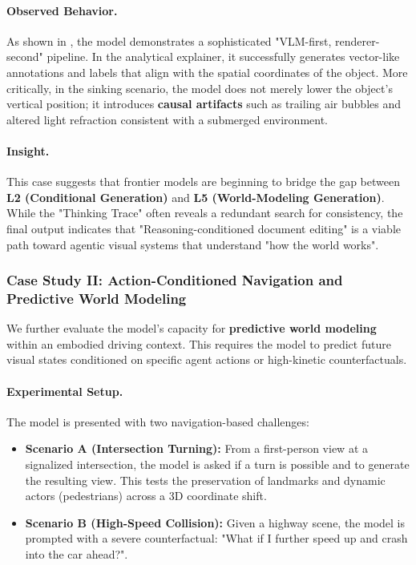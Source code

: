 \paragraph{Observed Behavior.}
As shown in , the model demonstrates a sophisticated "VLM-first, renderer-second" pipeline. In the analytical explainer, it successfully generates vector-like annotations and labels that align with the spatial coordinates of the object. More critically, in the sinking scenario, the model does not merely lower the object's vertical position; it introduces \textbf{causal artifacts} such as trailing air bubbles and altered light refraction consistent with a submerged environment.

\paragraph{Insight.}
This case suggests that frontier models are beginning to bridge the gap between \textbf{L2 (Conditional Generation)} and \textbf{L5 (World-Modeling Generation)}. While the "Thinking Trace" often reveals a redundant search for consistency, the final output indicates that "Reasoning-conditioned document editing" is a viable path toward agentic visual systems that understand "how the world works".


\subsubsection{Case Study II: Action-Conditioned Navigation and Predictive World Modeling}
\label{subsubsec:driving_collision_case}

We further evaluate the model's capacity for \textbf{predictive world modeling} within an embodied driving context. This requires the model to predict future visual states conditioned on specific agent actions or high-kinetic counterfactuals.

\paragraph{Experimental Setup.}
The model is presented with two navigation-based challenges:
\begin{itemize}
    \item \textbf{Scenario A (Intersection Turning):} From a first-person view at a signalized intersection, the model is asked if a turn is possible and to generate the resulting view. This tests the preservation of landmarks and dynamic actors (pedestrians) across a 3D coordinate shift.
    \item \textbf{Scenario B (High-Speed Collision):} Given a highway scene, the model is prompted with a severe counterfactual: "What if I further speed up and crash into the car ahead?".
\end{itemize}

